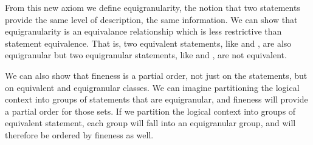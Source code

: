 \documentclass[11pt,letterpaper,fleqn]{memoir} %
\begin{document}
From this new axiom we define equigranularity, the notion that two statements provide the same level of description, the same information. We can show that equigranularity is an equivalance relationship which is less restrictive than statement equivalence. That is, two equivalent statements, like  and , are also equigranular but two equigranular statements, like  and , are not equivalent.

We can also show that fineness is a partial order, not just on the statements, but on equivalent and equigranular classes. We can imagine partitioning the logical context into groups of statements that are equigranular, and fineness will provide a partial order for those sets. If we partition the logical context into groups of equivalent statement, each group will fall into an equigranular group, and will therefore be ordered by fineness as well.
\end{document}
